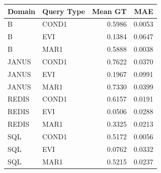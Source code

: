 \begin{tabular}{llrr}
\toprule
\textbf{Domain} & \textbf{Query Type} & \textbf{Mean GT} & \textbf{MAE} \\
\midrule
B & COND1 & 0.5986 & 0.0053 \\
B & EVI & 0.1384 & 0.0647 \\
B & MAR1 & 0.5888 & 0.0038 \\
JANUS & COND1 & 0.7622 & 0.0370 \\
JANUS & EVI & 0.1967 & 0.0991 \\
JANUS & MAR1 & 0.7330 & 0.0399 \\
REDIS & COND1 & 0.6157 & 0.0191 \\
REDIS & EVI & 0.0506 & 0.0288 \\
REDIS & MAR1 & 0.3325 & 0.0213 \\
SQL & COND1 & 0.5172 & 0.0056 \\
SQL & EVI & 0.0762 & 0.0332 \\
SQL & MAR1 & 0.5215 & 0.0237 \\
\bottomrule
\end{tabular}
